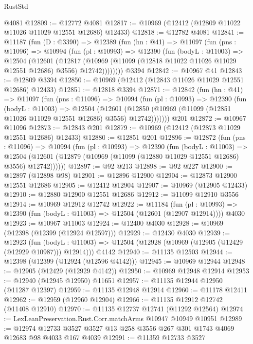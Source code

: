 \begin{lexlean}{RustStd}
\begin{coremodule}
    @4081
@12809 := @12772 @4081
@12817 := @10969 (@12412 (@12809 @11022 @11026 @11029 @12551 @12686) @12433)
@12818 := @12782 @4081
@12841 := @11187
    (fun (D : @3390) =>
    @12389
      (fun (hn : @41) =>
      @11097
        (fun (pns : @11096) =>
        @10994
          (fun (pl : @10993) =>
          @12390
            (fun (bodyL : @11003) =>
            @12504
              (@12601
                (@12817
                  (@10969 (@11099 (@12818 @11022 @11026 @11029 @12551 @12686) @3556) @12742))))))))
    @3394
@12842 := @10967 @41
@12843 := @12809 @3394
@12850 := @10969 (@12412 (@12843 @11026 @11029 @12551 @12686) @12433)
@12851 := @12818 @3394
@12871 := @12842
    (fun (hn : @41) =>
    @11097
      (fun (pns : @11096) =>
      @10994
        (fun (pl : @10993) =>
        @12390
          (fun (bodyL : @11003) =>
          @12504
            (@12601
              (@12850 (@10969 (@11099 (@12851 @11026 @11029 @12551 @12686) @3556) @12742)))))))
    @201
@12872 := @10967 @11096
@12873 := @12843 @201
@12879 := @10969 (@12412 (@12873 @11029 @12551 @12686) @12433)
@12880 := @12851 @201
@12896 := @12872
    (fun (pns : @11096) =>
    @10994
      (fun (pl : @10993) =>
      @12390
        (fun (bodyL : @11003) =>
        @12504 (@12601 (@12879 (@10969 (@11099 (@12880 @11029 @12551 @12686) @3556) @12742))))))
@12897 := @92 @213
@12898 := @92 @227
@12900 := @12897 (@12898 @98)
@12901 := @12896 @12900
@12904 := @12873 @12900 @12551 @12686
@12905 := @12412 @12904
@12907 := @10969 (@12905 @12433)
@12910 := @12880 @12900 @12551 @12686
@12912 := @11099 @12910 @3556
@12914 := @10969 @12912 @12742
@12922 := @11184
    (fun (pl : @10993) => @12390 (fun (bodyL : @11003) => @12504 (@12601 (@12907 @12914))))
    @4030
@12923 := @10967 @11003
@12924 := @12400 @4030
@12928 := @10969 (@12398 (@12399 (@12924 @12597)))
@12929 := @12430 @4030
@12939 := @12923
    (fun (bodyL : @11003) => @12504 (@12928 (@10969 (@12905 (@12429 (@12929 @10987))) @12914)))
    @4142
@12940 := @11135 @12503
@12944 := @12398 (@12399 (@12924 (@12596 @4142)))
@12945 := @10969 @12944
@12948 := @12905 (@12429 (@12929 @4142))
@12950 := @10969 @12948 @12914
@12953 := @12940 (@12945 @12950) @11651
@12957 := @11135 @12944 @12950 (@11287 @12397)
@12959 := @11135 @12948 @12914
@12960 := @11178 @12411
@12962 := @12959 (@12960 @12904)
@12966 := @11135 @12912 @12742 (@11408 @12910)
@12970 := @11135 @12737 @12741 (@11292 @12564)
@12974 := LexLeanPreservation.Rust.Corr.matchArms @10947 @10949 @10951
@12989 := @12974 @12733 @3527 @3527 @13 @258 @3556 @267 @301 @1743 @4069 @12683 @98 @4033 @167 @4039
@12991 := @11359 @12733 @3527

\end{coremodule}
\end{lexlean}

